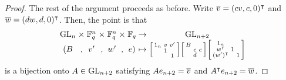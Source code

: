 \begin{proof}
    The rest of the argument proceeds as before. Write $\overline{v}=(cv,c,0)^\intercal$ and $\overline{w}=(dw,d,0)^\intercal$. Then, the point is that
    \[\arraycolsep=1.4pt\begin{array}{ccccccccccccc}
        \GL_n &\times& \FF_q^n &\times& \FF_q^n &\times& \FF_q &\to& \GL_{n+2} \\
        (B &,& v' &,& w' &,& e) &\mapsto& \begin{bsmallmatrix}
            1_n & v & v' \\
            & 1 \\ && 1
        \end{bsmallmatrix}\begin{bsmallmatrix}
            B \\ & e & c \\ & d
        \end{bsmallmatrix}\begin{bsmallmatrix}
            1_n \\
            w^\intercal & 1 \\ (w')^\intercal && 1
        \end{bsmallmatrix}
    \end{array}\]
    is a bijection onto $A\in\mathrm{GL}_{n+2}$ satisfying $Ae_{n+2}=\overline{v}$ and $A^\intercal e_{n+2}=\overline{w}$.
    

\end{proof}
